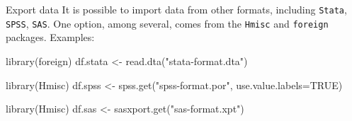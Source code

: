 \documentclass[
  11pt,
  ignorenonframetext,
  svgnames, handout, t]{beamer}
\newenvironment{Shaded}{\begin{snugshade}}{\end{snugshade}}
\newcommand{\AttributeTok}[1]{\textcolor[rgb]{0.77,0.63,0.00}{#1}}
\newcommand{\ConstantTok}[1]{\textcolor[rgb]{0.00,0.00,0.00}{#1}}
\newcommand{\FunctionTok}[1]{\textcolor[rgb]{0.00,0.00,0.00}{#1}}
\newcommand{\NormalTok}[1]{#1}
\newcommand{\OtherTok}[1]{\textcolor[rgb]{0.56,0.35,0.01}{#1}}
\newcommand{\StringTok}[1]{\textcolor[rgb]{0.31,0.60,0.02}{#1}}
\begin{document}
\begin{frame}[fragile]{Export data}
\protect\hypertarget{export-data-1}{}
It is possible to import data from other formats, including
\texttt{Stata}, \texttt{SPSS}, \texttt{SAS}. One option, among several,
comes from the \texttt{Hmisc} and \texttt{foreign} packages. Examples:

\footnotesize

\begin{Shaded}
\begin{Highlighting}[]
\FunctionTok{library}\NormalTok{(foreign)}
\NormalTok{df.stata }\OtherTok{\textless{}{-}} \FunctionTok{read.dta}\NormalTok{(}\StringTok{"stata{-}format.dta"}\NormalTok{)}

\FunctionTok{library}\NormalTok{(Hmisc)}
\NormalTok{df.spss }\OtherTok{\textless{}{-}} \FunctionTok{spss.get}\NormalTok{(}\StringTok{"spss{-}format.por"}\NormalTok{, }\AttributeTok{use.value.labels=}\ConstantTok{TRUE}\NormalTok{)}

\FunctionTok{library}\NormalTok{(Hmisc)}
\NormalTok{df.sas }\OtherTok{\textless{}{-}} \FunctionTok{sasxport.get}\NormalTok{(}\StringTok{"sas{-}format.xpt"}\NormalTok{)}
\end{Highlighting}
\end{Shaded}

\normalsize
\end{frame}
\end{document}
